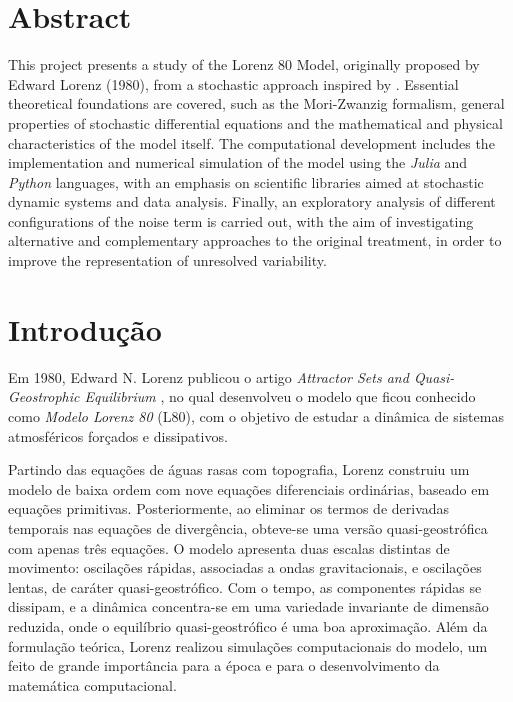 \documentclass[12pt]{article}
\newenvironment{resumo}{
  \fontsize{10pt}{12pt}\selectfont  %
  \setstretch{1}                    %
  \par\noindent                     %
  \justifying                      %
}{
  \par
}
\begin{document}
\section*{Abstract}
\begin{resumo}
    This project presents a study of the Lorenz 80 Model, originally proposed by Edward Lorenz (1980), from a stochastic approach inspired by \citet{Chekroun2021}. Essential theoretical foundations are covered, such as the Mori-Zwanzig formalism, general properties of stochastic differential equations and the mathematical and physical characteristics of the model itself. The computational development includes the implementation and numerical simulation of the model using the \textit{Julia} and \textit{Python} languages, with an emphasis on scientific libraries aimed at stochastic dynamic systems and data analysis. Finally, an exploratory analysis of different configurations of the noise term is carried out, with the aim of investigating alternative and complementary approaches to the original treatment, in order to improve the representation of unresolved variability.
\end{resumo}

\newpage

\section*{Introdução}

Em 1980, Edward N. Lorenz publicou o artigo \textit{Attractor Sets and Quasi-Geostrophic Equilibrium} \citep{Lorenz1980}, no qual desenvolveu o modelo que ficou conhecido como \textit{Modelo Lorenz 80} (L80), com o objetivo de estudar a dinâmica de sistemas atmosféricos forçados e dissipativos.

Partindo das equações de águas rasas com topografia, Lorenz construiu um modelo de baixa ordem com nove equações diferenciais ordinárias, baseado em equações primitivas. Posteriormente, ao eliminar os termos de derivadas temporais nas equações de divergência, obteve-se uma versão quasi-geostrófica com apenas três equações. O modelo apresenta duas escalas distintas de movimento: oscilações rápidas, associadas a ondas gravitacionais, e oscilações lentas, de caráter quasi-geostrófico. Com o tempo, as componentes rápidas se dissipam, e a dinâmica concentra-se em uma variedade invariante de dimensão reduzida, onde o equilíbrio quasi-geostrófico é uma boa aproximação. Além da formulação teórica, Lorenz realizou simulações computacionais do modelo, um feito de grande importância para a época e para o desenvolvimento da matemática computacional.
\end{document}
